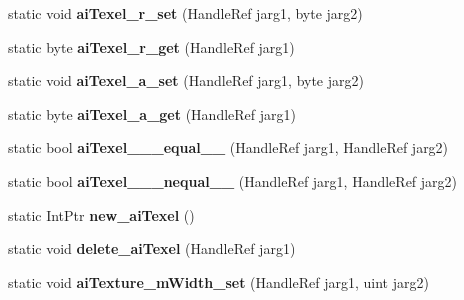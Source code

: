 \begin{DoxyCompactItemize}
\item 
\hypertarget{class_assimp_p_i_n_v_o_k_e_a04720db0ed42611205fe70bb260384c2}{static void {\bfseries ai\+Texel\+\_\+r\+\_\+set} (Handle\+Ref jarg1, byte jarg2)}\label{class_assimp_p_i_n_v_o_k_e_a04720db0ed42611205fe70bb260384c2}

\item 
\hypertarget{class_assimp_p_i_n_v_o_k_e_a774f79e85c92db4d601b11863d7dbdbe}{static byte {\bfseries ai\+Texel\+\_\+r\+\_\+get} (Handle\+Ref jarg1)}\label{class_assimp_p_i_n_v_o_k_e_a774f79e85c92db4d601b11863d7dbdbe}

\item 
\hypertarget{class_assimp_p_i_n_v_o_k_e_af2748720c3a92b5d4e7a06544a214996}{static void {\bfseries ai\+Texel\+\_\+a\+\_\+set} (Handle\+Ref jarg1, byte jarg2)}\label{class_assimp_p_i_n_v_o_k_e_af2748720c3a92b5d4e7a06544a214996}

\item 
\hypertarget{class_assimp_p_i_n_v_o_k_e_a17896a2dbd4e38cf6e5c7acfddbdfea3}{static byte {\bfseries ai\+Texel\+\_\+a\+\_\+get} (Handle\+Ref jarg1)}\label{class_assimp_p_i_n_v_o_k_e_a17896a2dbd4e38cf6e5c7acfddbdfea3}

\item 
\hypertarget{class_assimp_p_i_n_v_o_k_e_a2c9fcd792b1994ee0c8c6f98a0360df5}{static bool {\bfseries ai\+Texel\+\_\+\+\_\+\+\_\+equal\+\_\+\+\_\+} (Handle\+Ref jarg1, Handle\+Ref jarg2)}\label{class_assimp_p_i_n_v_o_k_e_a2c9fcd792b1994ee0c8c6f98a0360df5}

\item 
\hypertarget{class_assimp_p_i_n_v_o_k_e_aab21a084da649e99571454ec9c404e5a}{static bool {\bfseries ai\+Texel\+\_\+\+\_\+\+\_\+nequal\+\_\+\+\_\+} (Handle\+Ref jarg1, Handle\+Ref jarg2)}\label{class_assimp_p_i_n_v_o_k_e_aab21a084da649e99571454ec9c404e5a}

\item 
\hypertarget{class_assimp_p_i_n_v_o_k_e_ae863ef2cb99584bb7f0d940b96ece8a7}{static Int\+Ptr {\bfseries new\+\_\+ai\+Texel} ()}\label{class_assimp_p_i_n_v_o_k_e_ae863ef2cb99584bb7f0d940b96ece8a7}

\item 
\hypertarget{class_assimp_p_i_n_v_o_k_e_a39abe0bd0722d16d8a5dc2f8ecc6b6a0}{static void {\bfseries delete\+\_\+ai\+Texel} (Handle\+Ref jarg1)}\label{class_assimp_p_i_n_v_o_k_e_a39abe0bd0722d16d8a5dc2f8ecc6b6a0}

\item 
\hypertarget{class_assimp_p_i_n_v_o_k_e_aa2728ee41bd50205a310140cff689fa0}{static void {\bfseries ai\+Texture\+\_\+m\+Width\+\_\+set} (Handle\+Ref jarg1, uint jarg2)}\label{class_assimp_p_i_n_v_o_k_e_aa2728ee41bd50205a310140cff689fa0}


\end{DoxyCompactItemize}
